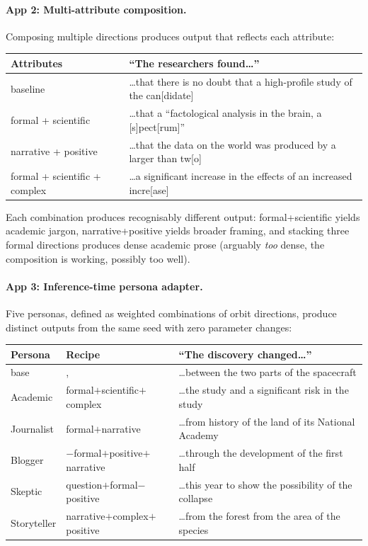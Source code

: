 \documentclass[11pt, a4paper]{article}
\theoremstyle{plain}
\theoremstyle{definition}
\theoremstyle{remark}
\begin{document}
\paragraph{App 2: Multi-attribute composition.}
Composing multiple directions produces output that reflects each attribute:
\begin{center}\small
\begin{tabular}{lp{8cm}}
\toprule
\textbf{Attributes} & \textbf{``The researchers found\ldots''} \\
\midrule
baseline & \ldots that there is no doubt that a high-profile study of the can[didate] \\
formal + scientific & \ldots that a ``factological analysis in the brain, a [s]pect[rum]'' \\
narrative + positive & \ldots that the data on the world was produced by a larger than tw[o] \\
formal + scientific + complex & \ldots a significant increase in the effects of an increased incre[ase] \\
\bottomrule
\end{tabular}
\end{center}

Each combination produces recognisably different output: formal+scientific yields academic jargon, narrative+positive yields broader framing, and stacking three formal directions produces dense academic prose (arguably \emph{too} dense, the composition is working, possibly too well).

\paragraph{App 3: Inference-time persona adapter.}
Five personas, defined as weighted combinations of orbit directions, produce distinct outputs from the same seed with zero parameter changes:

\begin{center}\small
\begin{tabular}{llp{6.5cm}}
\toprule
\textbf{Persona} & \textbf{Recipe} & \textbf{``The discovery changed\ldots''} \\
\midrule
base & ,  & \ldots between the two parts of the spacecraft \\
Academic & formal$+$scientific$+$complex & \ldots the study and a significant risk in the study \\
Journalist & formal$+$narrative & \ldots from history of the land of its National Academy \\
Blogger & $-$formal$+$positive$+$narrative & \ldots through the development of the first half \\
Skeptic & question$+$formal$-$positive & \ldots this year to show the possibility of the collapse \\
Storyteller & narrative$+$complex$+$positive & \ldots from the forest from the area of the species \\
\bottomrule
\end{tabular}
\end{center}
\end{document}
